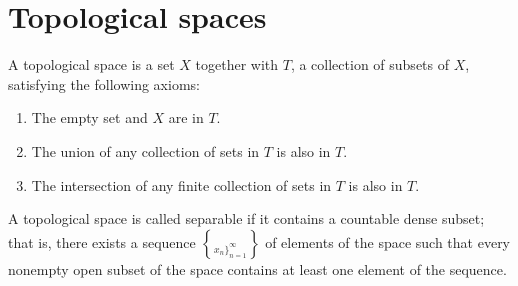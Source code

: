 \section{Topological spaces}

A topological space is a set $X$ together with
$T$, a collection of subsets of $X$, satisfying the following axioms:
\begin{enumerate}
\item
The empty set and $X$ are in $T$.
\item
The union of any collection of sets in $T$ is also in $T$.
\item
The intersection of any finite collection of sets in $T$ is also in $T$.
\end{enumerate}
A topological space is called separable if it
contains a countable dense subset; that is, there exists a sequence
$\brace x_n \rbrace_{n=1}^{\infty}$ of elements of the space such that
every nonempty open subset of the space contains at least one element
of the sequence.